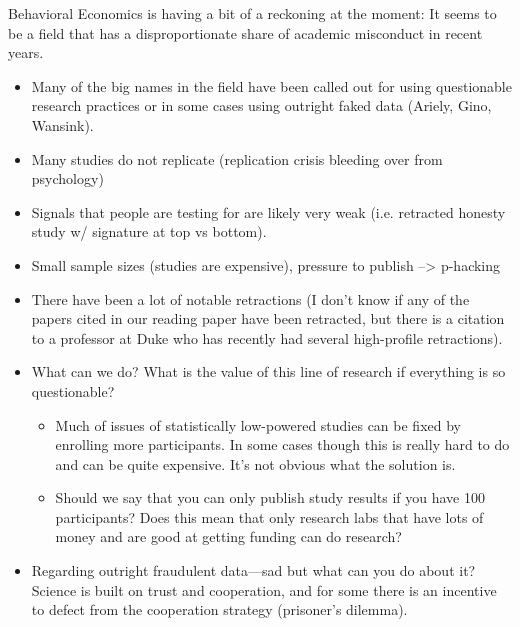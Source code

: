 \documentclass[11pt]{article}
\begin{document}
Behavioral Economics is having a bit of a reckoning at the moment: It seems to be a field that has a disproportionate share of academic misconduct in recent years. 
\begin{itemize}
    \item Many of the big names in the field have been called out for using questionable research practices or in some cases using outright faked data (Ariely, Gino, Wansink).
    \item Many studies do not replicate (replication crisis bleeding over from psychology)
    \item Signals that people are testing for are likely very weak (i.e. retracted honesty study w/ signature at top vs bottom).
    \item Small sample sizes (studies are expensive), pressure to publish --> p-hacking 
    \item There have been a lot of notable retractions (I don't know if any of the papers cited in our reading paper have been retracted, but there is a citation to a professor at Duke who has recently had several high-profile retractions).
    \item What can we do? What is the value of this line of research if everything is so questionable?
    \begin{itemize}
        \item Much of issues of statistically low-powered studies can be fixed by enrolling more participants. In some cases though this is really hard to do and can be quite expensive. It's not obvious what the solution is. 
        \item Should we say that you can only publish study results if you have 100 participants? Does this mean that only research labs that have lots of money and are good at getting funding can do research?
    \end{itemize}
    \item Regarding outright fraudulent data---sad but what can you do about it? Science is built on trust and cooperation, and for some there is an incentive to defect from the cooperation strategy (prisoner's dilemma).
\end{itemize} 
\end{document}
